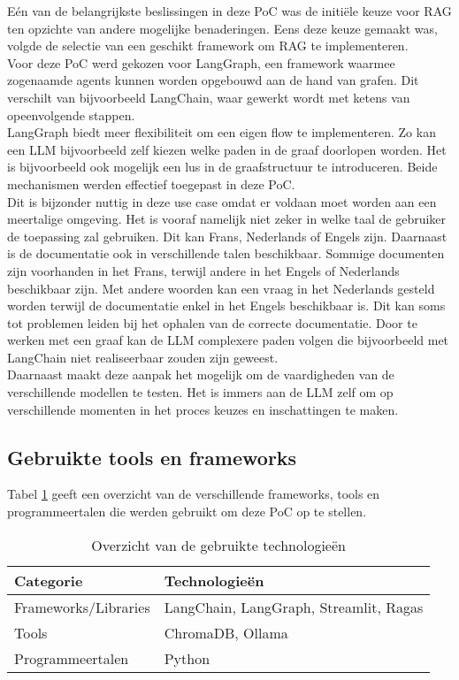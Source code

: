 Eén van de belangrijkste beslissingen in deze PoC was de initiële keuze voor RAG ten opzichte van andere mogelijke benaderingen. Eens deze keuze gemaakt was, volgde de selectie van een geschikt framework om RAG te implementeren.
\\[1em]
Voor deze PoC werd gekozen voor LangGraph, een framework waarmee zogenaamde agents kunnen worden opgebouwd aan de hand van grafen. Dit verschilt van bijvoorbeeld LangChain, waar gewerkt wordt met ketens van opeenvolgende stappen.
\\[1em]
LangGraph biedt meer flexibiliteit om een eigen flow te implementeren. Zo kan een LLM bijvoorbeeld zelf kiezen welke paden in de graaf doorlopen worden. Het is bijvoorbeeld ook mogelijk een lus in de graafstructuur te introduceren. Beide mechanismen werden effectief toegepast in deze PoC.
\\[1em]
Dit is bijzonder nuttig in deze use case omdat er voldaan moet worden aan een meertalige omgeving. Het is vooraf namelijk niet zeker in welke taal de gebruiker de toepassing zal gebruiken. Dit kan Frans, Nederlands of Engels zijn. Daarnaast is de documentatie ook in verschillende talen beschikbaar. Sommige documenten zijn voorhanden in het Frans, terwijl andere in het Engels of Nederlands beschikbaar zijn. Met andere woorden kan een vraag in het Nederlands gesteld worden terwijl de documentatie enkel in het Engels beschikbaar is. Dit kan soms tot problemen leiden bij het ophalen van de correcte documentatie. Door te werken met een graaf kan de LLM complexere paden volgen die bijvoorbeeld met LangChain niet realiseerbaar zouden zijn geweest.
\\[1em]
Daarnaast maakt deze aanpak het mogelijk om de vaardigheden van de verschillende modellen te testen. Het is immers aan de LLM zelf om op verschillende momenten in het proces keuzes en inschattingen te maken.

\subsection{Gebruikte tools en frameworks}
Tabel \ref{tab:gebruikte_technologieen} geeft een overzicht van de verschillende frameworks, tools en programmeertalen die werden gebruikt om deze PoC op te stellen.

\begin{table}[H]
    \begin{tabular}{|l|l|}
        \hline
        \textbf{Categorie}       & \textbf{Technologieën}               \\ \hline
        Frameworks/Libraries     & LangChain, LangGraph, Streamlit, Ragas \\ \hline
        Tools                   & ChromaDB, Ollama                    \\ \hline
        Programmeertalen        & Python                             \\ \hline
    \end{tabular}
    \caption{Overzicht van de gebruikte technologieën}
    \label{tab:gebruikte_technologieen}
\end{table}

